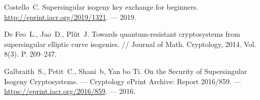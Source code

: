\documentclass[a4paper,12pt]{article}
\theoremstyle{definition}
\begin{document}
\begin{thebibliography}{1}

 Costello~C. Supersingular isogeny key exchange for beginners. \url{http://eprint.iacr.org/2019/1321}. --- 2019.

 
 
   De Feo~L., Jao~D., Plût~J.   Towards quantum-resistant cryptosystems from supersingular elliptic curve isogenies.  // Journal of Math. Cryptology, 2014. Vol. 8(3). P. 209--247. 

%  




  


Galbraith~S., Petit~C.,  Shani~b, Yan bo Ti.
\newblock
On the Security of Supersingular Isogeny Cryptosystems. --- 
Cryptology ePrint Archive: Report 2016/859. --- \newblock \url{https://eprint.iacr.org/2016/859}. --- 2016.


\end{thebibliography}
\end{document}
